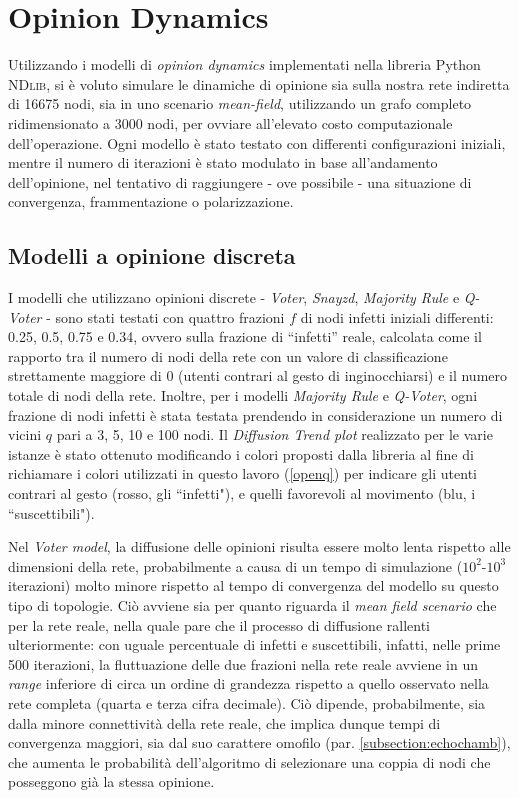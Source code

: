\section{Opinion Dynamics}

    Utilizzando i modelli di \textit{opinion dynamics} implementati nella libreria Python {\scshape NDlib}, si è voluto simulare le dinamiche di opinione sia sulla nostra rete indiretta di 16675 nodi, sia in uno scenario \textit{mean-field}, utilizzando un grafo completo ridimensionato a 3000 nodi, per ovviare all’elevato costo computazionale dell’operazione. 
    Ogni modello è stato testato con differenti configurazioni iniziali, mentre il numero di iterazioni è stato modulato in base all’andamento dell’opinione, nel tentativo di raggiungere - ove possibile - una situazione di convergenza, frammentazione o polarizzazione.\\ 
    
    \subsection{Modelli a opinione discreta}
    I modelli che utilizzano opinioni discrete - \textit{Voter}, \textit{Snayzd}, \textit{Majority Rule} e \textit{Q-Voter} - sono stati testati con quattro frazioni $f$ di nodi infetti iniziali differenti: 0.25, 0.5, 0.75 e 0.34, ovvero sulla frazione di “infetti” reale, calcolata come il rapporto tra il numero di nodi della rete con un valore di classificazione strettamente maggiore di 0 (utenti contrari al gesto di inginocchiarsi) e il numero totale di nodi della rete. Inoltre, per i modelli \textit{Majority Rule} e \textit{Q-Voter}, ogni frazione di nodi infetti è stata testata prendendo in considerazione un numero di vicini $q$ pari a 3, 5, 10 e 100 nodi. 
    Il \textit{Diffusion Trend plot} realizzato per le varie istanze è stato ottenuto modificando i colori proposti dalla libreria al fine di richiamare i colori utilizzati in questo lavoro (\ref{openq}) per indicare gli utenti contrari al gesto (rosso, gli ``infetti"), e quelli favorevoli al movimento (blu, i ``suscettibili"). 
    
    Nel \textit{Voter model}, la diffusione delle opinioni risulta essere molto lenta rispetto alle dimensioni della rete, probabilmente a causa di un tempo di simulazione ($10^2$-$10^3$ iterazioni) molto minore rispetto al tempo di convergenza del modello su questo tipo di topologie. Ciò avviene sia per quanto riguarda il \textit{mean field scenario} che per la rete reale, nella quale pare che il processo di diffusione rallenti ulteriormente: con uguale percentuale di infetti e suscettibili, infatti, nelle prime 500 iterazioni, la fluttuazione delle due frazioni nella rete reale avviene in un \textit{range} inferiore di circa un ordine di grandezza rispetto a quello osservato nella rete completa (quarta e terza cifra decimale). Ciò dipende, probabilmente, sia dalla minore connettività della rete reale, che implica dunque tempi di convergenza maggiori, sia dal suo carattere omofilo (par. \ref{subsection:echochamb}), che aumenta le probabilità dell'algoritmo di selezionare una coppia di nodi che posseggono già la stessa opinione.
    
